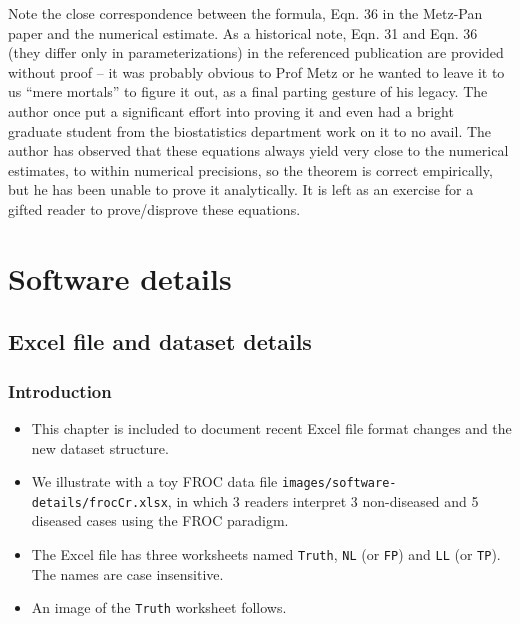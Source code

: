 \documentclass[
]{book}
\providecommand{\tightlist}{%
  \setlength{\itemsep}{0pt}\setlength{\parskip}{0pt}}
\begin{document}
Note the close correspondence between the formula, Eqn. 36 in the Metz-Pan paper and the numerical estimate. As a historical note, Eqn. 31 and Eqn. 36 (they differ only in parameterizations) in the referenced publication are provided without proof -- it was probably obvious to Prof Metz or he wanted to leave it to us ``mere mortals'' to figure it out, as a final parting gesture of his legacy. The author once put a significant effort into proving it and even had a bright graduate student from the biostatistics department work on it to no avail. The author has observed that these equations always yield very close to the numerical estimates, to within numerical precisions, so the theorem is correct empirically, but he has been unable to prove it analytically. It is left as an exercise for a gifted reader to prove/disprove these equations.

\hypertarget{part-software-details}{%
\part*{Software details}\label{part-software-details}}

\hypertarget{dataset-object-details}{%
\chapter{Excel file and dataset details}\label{dataset-object-details}}

\hypertarget{introduction-3}{%
\section{Introduction}\label{introduction-3}}

\begin{itemize}
\tightlist
\item
  This chapter is included to document recent Excel file format changes and the new dataset structure.
\item
  We illustrate with a toy FROC data file \texttt{images/software-details/frocCr.xlsx}, in which 3 readers interpret 3 non-diseased and 5 diseased cases using the FROC paradigm.
\item
  The Excel file has three worksheets named \texttt{Truth}, \texttt{NL} (or \texttt{FP}) and \texttt{LL} (or \texttt{TP}). The names are case insensitive.
\item
  An image of the \texttt{Truth} worksheet follows.
\end{itemize}
\end{document}
